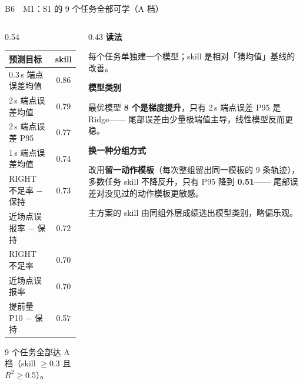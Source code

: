 \documentclass[aspectratio=169,10pt]{ctexbeamer}
\begin{document}
\begin{frame}{B6\ \ M1：S1 的 9 个任务全部可学（A 档）}
  \vspace{-0.4em}
  \begin{columns}[T]
    \begin{column}{0.54\textwidth}
      \footnotesize
      \renewcommand{\arraystretch}{1.30}
      \begin{tabular}{@{}lc@{}}
        \toprule
        \textbf{预测目标} & \textbf{skill} \\
        \midrule
        0.3\,s 端点误差均值 & 0.86 \\
        2\,s 端点误差均值 & 0.79 \\
        2\,s 端点误差 P95 & 0.77 \\
        1\,s 端点误差均值 & 0.74 \\
        RIGHT 不足率 $-$ 保持 & 0.73 \\
        近场点误报率 $-$ 保持 & 0.72 \\
        RIGHT 不足率 & 0.70 \\
        近场点误报率 & 0.70 \\
        提前量 P10 $-$ 保持 & 0.57 \\
        \bottomrule
      \end{tabular}
      \vspace{0.4em}

      {\scriptsize\color{black!62}9 个任务全部达 A 档（skill $\ge$0.3 且 $R^2\ge$0.5）。}
    \end{column}
    \begin{column}{0.43\textwidth}
      \footnotesize
      \textbf{读法}\par
      每个任务单独建一个模型；skill 是相对「猜均值」基线的改善。

      \vspace{0.9em}
      \textbf{模型类别}\par
      最优模型 \textbf{8 个是梯度提升}，只有 2\,s 端点误差 P95 是 Ridge——
      尾部误差由少量极端值主导，线性模型反而更稳。

      \vspace{0.9em}
      \textbf{换一种分组方式}\par
      改用\textbf{留一动作模板}（每次整组留出同一模板的 9 条轨迹），
      多数任务 skill 不降反升，只有 P95 降到 \textbf{0.51}——
      尾部误差对没见过的动作模板更敏感。

      \vspace{0.9em}
      {\scriptsize\color{black!65}主方案的 skill 由同组外层成绩选出模型类别，略偏乐观。}
    \end{column}
  \end{columns}
\end{frame}
\end{document}
